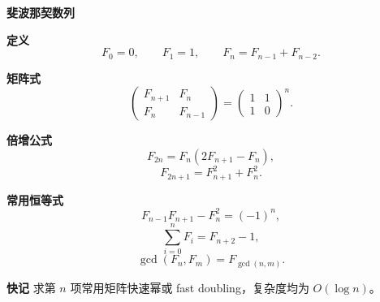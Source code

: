\textbf{斐波那契数列}

\textbf{定义}
\[
F_0=0,\qquad F_1=1,\qquad F_n=F_{n-1}+F_{n-2}.
\]

\textbf{矩阵式}
\[
\begin{pmatrix}
F_{n+1} & F_n\\
F_n & F_{n-1}
\end{pmatrix}
=
\begin{pmatrix}
1 & 1\\
1 & 0
\end{pmatrix}^{n}.
\]

\textbf{倍增公式}
\[
F_{2n}=F_n(2F_{n+1}-F_n),
\]
\[
F_{2n+1}=F_{n+1}^2+F_n^2.
\]

\textbf{常用恒等式}
\[
F_{n-1}F_{n+1}-F_n^2=(-1)^n,
\]
\[
\sum_{i=0}^{n}F_i=F_{n+2}-1,
\]
\[
\gcd(F_n,F_m)=F_{\gcd(n,m)}.
\]

\textbf{快记}
求第 $n$ 项常用矩阵快速幂或 fast doubling，复杂度均为 $O(\log n)$。
